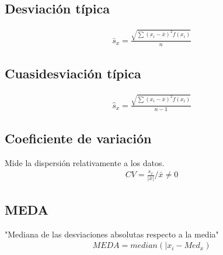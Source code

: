\documentclass{article}
\begin{document}
\subsection{Desviación típica}
\begin{equation}
    \begin{split}
        \bar{s}_{x}=\frac{\sqrt{ \sum(x_{i}-\bar{x})^{2}f(x_{i}) }}{n}
    \end{split}
\end{equation}
\subsection{Cuasidesviación típica}
\begin{equation}
    \begin{split}
        \hat{s}_{x}=\frac{\sqrt{ \sum(x_{i}-\bar{x})^{2}f(x_{i}) }}{n-1}
    \end{split}
\end{equation}
\subsection{Coeficiente de variación}
Mide la dispersión relativamente a los datos.
\begin{equation}
    \begin{split}
        CV=\frac{s_{x}}{|\bar{x}|} / \bar{x}\neq 0
    \end{split}
\end{equation}
\subsection{MEDA}
"Mediana de las desviaciones absolutas respecto a la media"
\begin{equation}
    \begin{split}
        MEDA=median(|x_{i}-Med_{x})
    \end{split}
\end{equation}
\end{document}
